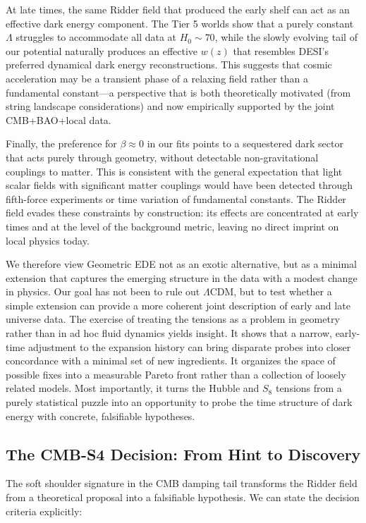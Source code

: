 \documentclass[a4paper,11pt]{article}
\begin{document}
At late times, the same Ridder field that produced the early shelf can act as an effective dark energy component. The Tier 5 worlds show that a purely constant $\Lambda$ struggles to accommodate all data at $H_0 \sim 70$, while the slowly evolving tail of our potential naturally produces an effective $w(z)$ that resembles DESI's preferred dynamical dark energy reconstructions. This suggests that cosmic acceleration may be a transient phase of a relaxing field rather than a fundamental constant---a perspective that is both theoretically motivated (from string landscape considerations) and now empirically supported by the joint CMB+BAO+local data.

Finally, the preference for $\beta \approx 0$ in our fits points to a sequestered dark sector that acts purely through geometry, without detectable non-gravitational couplings to matter. This is consistent with the general expectation that light scalar fields with significant matter couplings would have been detected through fifth-force experiments or time variation of fundamental constants. The Ridder field evades these constraints by construction: its effects are concentrated at early times and at the level of the background metric, leaving no direct imprint on local physics today.

We therefore view Geometric EDE not as an exotic alternative, but as a minimal extension that captures the emerging structure in the data with a modest change in physics. Our goal has not been to rule out $\Lambda$CDM, but to test whether a simple extension can provide a more coherent joint description of early and late universe data. The exercise of treating the tensions as a problem in geometry rather than in ad hoc fluid dynamics yields insight. It shows that a narrow, early-time adjustment to the expansion history can bring disparate probes into closer concordance with a minimal set of new ingredients. It organizes the space of possible fixes into a measurable Pareto front rather than a collection of loosely related models. Most importantly, it turns the Hubble and $S_8$ tensions from a purely statistical puzzle into an opportunity to probe the time structure of dark energy with concrete, falsifiable hypotheses.

\subsection*{The CMB-S4 Decision: From Hint to Discovery}
\label{sec:s4_decision}

The soft shoulder signature in the CMB damping tail transforms the Ridder field from a theoretical proposal into a falsifiable hypothesis. We can state the decision criteria explicitly:
\end{document}
